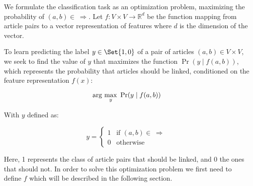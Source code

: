 
We formulate the classification task as an optimization problem, maximizing the probability of $(a,b) \in \ \Rightarrow$. Let $f: V\times V \to \mathbb{R}^d$ be the function mapping from article pairs to a vector representation of features where $d$ is the dimension of the vector.

To learn predicting the label $y \in \Set{1,0}$ of a pair of articles $(a,b) \in V \times V$,
we seek to find the value of $y$ that maximizes the function $\Pr(y \mid f(a,b))$, which represents the probability that articles should be linked, conditioned on the feature representation $f(x)$:

\begin{equation}
\label{objective}
\arg\ \!\max_y\ \Pr(y \mid f(a,b)) 
\end{equation}

With $y$ defined as:

\[
    y=
\begin{cases}
    1 & \text{if } (a,b) \in \  \Rightarrow\\
    0 & \text{otherwise}
\end{cases}
\]

Here, 1 represents the class of article pairs that should be linked, and 0 the ones that should not.
In order to solve this optimization problem we first need to define $f$ which will be described in the following section.

%
%
%

